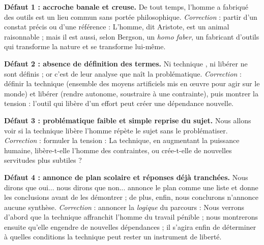 \documentclass[11pt]{article}
\newcommand{\cle}[1]{{\popxbold\color{popdark}#1}}
\begin{document}
\begin{corrige}
\textbf{Défaut 1 : accroche banale et creuse.} \og De tout temps, l'homme a fabriqué des outils \fg{} est un lieu commun sans portée philosophique. \emph{Correction} : partir d'un constat précis ou d'une référence : \og L'homme, dit Aristote, est un animal raisonnable ; mais il est aussi, selon Bergson, un \emph{homo faber}, un fabricant d'outils qui transforme la nature et se transforme lui-même. \fg{}

\textbf{Défaut 2 : absence de définition des termes.} Ni \og technique \fg{}, ni \og libérer \fg{} ne sont définis ; or c'est de leur analyse que naît la problématique. \emph{Correction} : définir la \cle{technique} (ensemble des moyens artificiels mis en œuvre pour agir sur le monde) et \cle{libérer} (rendre autonome, soustraire à une contrainte), puis montrer la tension : l'outil qui libère d'un effort peut créer une dépendance nouvelle.

\textbf{Défaut 3 : problématique faible et simple reprise du sujet.} \og Nous allons voir si la technique libère l'homme \fg{} répète le sujet sans le problématiser. \emph{Correction} : formuler la tension : \og La technique, en augmentant la puissance humaine, libère-t-elle l'homme des contraintes, ou crée-t-elle de nouvelles servitudes plus subtiles ? \fg{}

\textbf{Défaut 4 : annonce de plan scolaire et réponses déjà tranchées.} \og Nous dirons que oui... nous dirons que non... \fg{} annonce le plan comme une liste et donne les conclusions avant de les démontrer ; de plus, \og enfin, nous conclurons \fg{} n'annonce aucune synthèse. \emph{Correction} : annoncer la \emph{logique} du parcours : \og Nous verrons d'abord que la technique affranchit l'homme du travail pénible ; nous montrerons ensuite qu'elle engendre de nouvelles dépendances ; il s'agira enfin de déterminer à quelles conditions la technique peut rester un instrument de liberté. \fg{}
\end{corrige}
\end{document}
